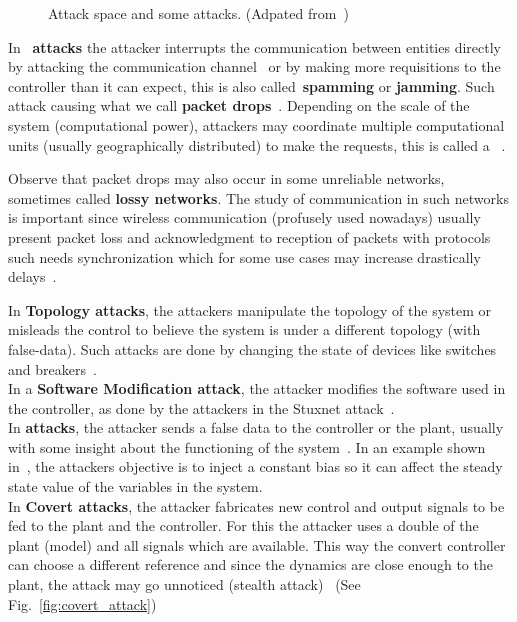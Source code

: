 \documentclass[../main.tex]{subfiles}
\begin{document}
\begin{figure}[h]
  \caption[Attack space and some attacks.]{Attack space and some attacks. (Adpated from~\cite{TeixeiraEtAl2015})}\label{fig:3_dimensions_attack_with_attacks}
\end{figure}

In~\textbf{\DoS{} attacks} the attacker interrupts the communication between entities directly by attacking the communication channel~\cite{SunYang2019,ZhaoEtAl2020,YangEtAl2019} or by making more requisitions to the controller than it can expect, this is also called~\textbf{spamming} or \textbf{jamming}.
Such attack causing what we call \textbf{packet drops}~\cite{ChenEtAl2021}.
Depending on the scale of the system (computational power), attackers may coordinate multiple computational units (usually geographically distributed) to make the requests, this is called a \dDoS{}~\cite{WangLu2013,HussainEtAl2021}.
\begin{remark}
  Observe that packet drops may also occur in some unreliable networks, sometimes called \textbf{lossy networks}.
  The study of communication in such networks is important since wireless communication (profusely used nowadays) usually present packet loss and acknowledgment to reception of packets with protocols such \tcpip{} needs synchronization which for some use cases may increase drastically delays~\cite{BofEtAl2019}.

\end{remark}

In \textbf{Topology attacks}, the attackers manipulate the topology of the system or misleads the control to believe the system is under a different topology (with false-data). Such attacks are done by changing the state of devices like switches and breakers~\cite{KimTong2013,WuEtAl2016,ZhangEtAl2021b}.
\\In a \textbf{Software Modification attack}, the attacker modifies the software used in the controller, as done by the attackers in the Stuxnet attack~\cite{Langner2011}.
\\In \textbf{\fdi{} attacks}, the attacker sends a false data to the controller or the plant, usually with some insight about the functioning of the system~\cite{PasqualettiEtAl2013}.
In an example shown in~\cite{TeixeiraEtAl2015}, the attackers objective is to inject a constant bias so it can affect the steady state value of the variables in the system.
\\In \textbf{Covert attacks}, the attacker fabricates new control and output signals to be fed to the plant and the controller.
For this the attacker uses a double of the plant (model) and all signals which are available.
This way the convert controller can choose a different reference and since the dynamics are close enough to the plant, the attack may go unnoticed (stealth attack)~\cite{Smith2015,HoehnZhang2016,BarboniEtAl2020} (See Fig.~\ref{fig:covert_attack})
\end{document}
